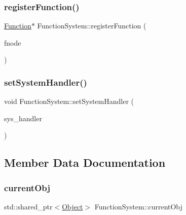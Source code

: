 \subsubsection{\texorpdfstring{register\+Function()}{registerFunction()}\hspace{0.1cm}{\footnotesize\ttfamily [2/2]}}
{\footnotesize\ttfamily \hyperlink{classFunction}{Function}$\ast$ Function\+System\+::register\+Function (\begin{DoxyParamCaption}\item[{\hyperlink{classFunctionNode}{Function\+Node} $\ast$}]{fnode }\end{DoxyParamCaption})}

\mbox{\label{classFunctionSystem_a7924e14b5794c595167aa9d547182883}} 
\subsubsection{\texorpdfstring{set\+System\+Handler()}{setSystemHandler()}}
{\footnotesize\ttfamily void Function\+System\+::set\+System\+Handler (\begin{DoxyParamCaption}\item[{\hyperlink{classSystemHandler}{System\+Handler} $\ast$}]{sys\+\_\+handler }\end{DoxyParamCaption})}



\subsection{Member Data Documentation}
\mbox{\label{classFunctionSystem_a59f2a49d91338ced0a79d3898412fcaf}} 
\subsubsection{\texorpdfstring{current\+Obj}{currentObj}}
{\footnotesize\ttfamily std\+::shared\+\_\+ptr$<$\hyperlink{classObject}{Object}$>$ Function\+System\+::current\+Obj}

